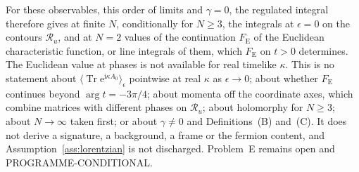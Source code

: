 For these observables, this order of limits and \(\gamma=0\), the regulated integral therefore gives at finite \(N\), conditionally for \(N\ge3\), the integrals at \(\epsilon=0\) on the contours \(\mathcal R_u\), and at \(N=2\) values of the continuation \(F_{\mathrm E}\) of the Euclidean characteristic function, or line integrals of them, which \(F_{\mathrm E}\) on \(t>0\) determines. The Euclidean value at phases is not available for real timelike \(\kappa\). This is no statement about \(\langle\operatorname{Tr}\mathrm e^{\mathrm i\kappa A_0}\rangle_\epsilon\) pointwise at real \(\kappa\) as \(\epsilon\to0\); about whether \(F_{\mathrm E}\) continues beyond \(\arg t=-3\pi/4\); about momenta off the coordinate axes, which combine matrices with different phases on \(\mathcal R_u\); about holomorphy for \(N\ge3\); about \(N\to\infty\) taken first; or about \(\gamma\neq0\) and Definitions~(B) and~(C). It does not derive a signature, a background, a frame or the fermion content, and Assumption~\ref{ass:lorentzian} is not discharged. Problem~E remains open and PROGRAMME-CONDITIONAL.
